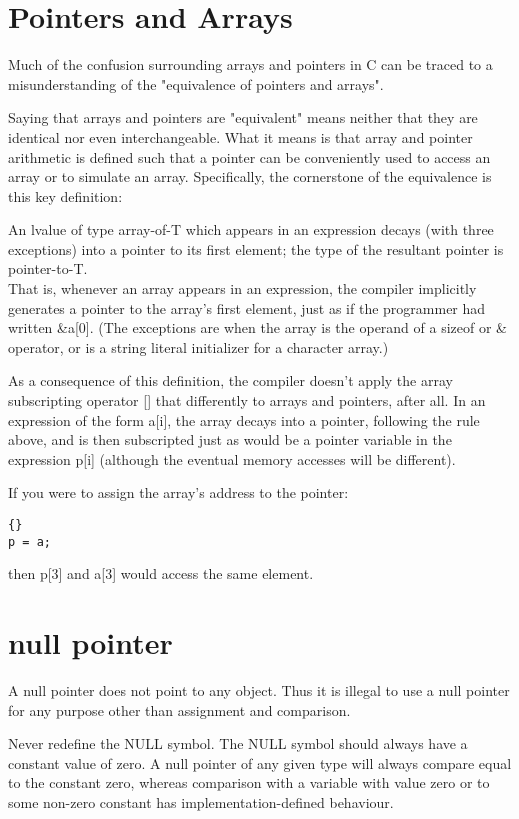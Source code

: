 \documentclass{report}
\begin{document}
\section{Pointers and Arrays}
Much of the confusion surrounding arrays and pointers in C can be traced to a misunderstanding of the "equivalence of pointers and arrays".

Saying that arrays and pointers are "equivalent" means neither that they are identical nor even interchangeable.  What it means is that array and pointer arithmetic is defined such that a pointer can be conveniently used to access an array or to simulate an array.
Specifically, the cornerstone of the equivalence is this key definition:

An lvalue of type array-of-T which appears in an expression decays (with three exceptions) into a pointer to its first element; the type of the resultant pointer is pointer-to-T.\\
That is, whenever an array appears in an expression, the compiler implicitly generates a pointer to the array's first element, just as if the programmer had written \&a[0]. (The exceptions are when the array is the operand of a sizeof or \& operator, or is a string literal initializer for a character array.)

As a consequence of this definition, the compiler doesn't apply the array subscripting operator [] that differently to arrays and pointers, after all.  In an expression of the form a[i], the array decays into a pointer, following the rule above, and is then subscripted just as would be a pointer variable in the expression p[i] (although the eventual memory accesses will be different).

If you were to assign the array's address to the pointer:
\begin{lstlisting}{}
p = a;
\end{lstlisting}
then p[3] and a[3] would access the same element.
	

\section{null pointer} 
A null pointer does not point to any object. Thus it is illegal to use a null pointer for any purpose other than assignment and comparison.

Never redefine the NULL symbol. The NULL symbol should always have a constant value of zero. A null pointer of any given type will always compare equal to the constant zero, whereas comparison with a variable with value zero or to some non-zero constant has implementation-defined behaviour.
\end{document}
